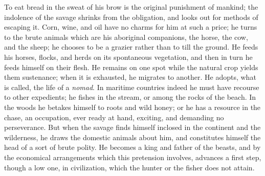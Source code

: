 To eat bread in the sweat of
his brow is the original punishment of mankind; the indolence of the
savage shrinks from the obligation, and looks out for methods of
escaping it. Corn, wine, and oil have no charms for him at such a
price; he turns to the brute animals which are his aboriginal
companions, the horse, the cow, and the sheep; he chooses to be a
grazier rather than to till the ground. He feeds his horses, flocks,
and herds on its spontaneous vegetation, and then in turn he feeds
himself on their flesh. He remains on one spot while the natural crop
yields them sustenance; when it is exhausted, he migrates to another.
He adopts, what is called, the life of a \emph{nomad}. In maritime
countries indeed he must have recourse to other expedients; he fishes
in the stream, or among the rocks of the beach. In the woods he
betakes himself to roots and wild honey; or he has a resource in the
chase, an occupation, ever ready at hand, exciting, and demanding no
perseverance. But when the savage finds himself inclosed in the
continent and the wilderness, he draws the domestic animals about him,
and constitutes himself the head of a sort of brute polity. He becomes
a king and father of the beasts, and by the economical arrangements
which this pretension involves, advances a first step, though a low
one, in civilization, which the hunter or the fisher does not attain.

